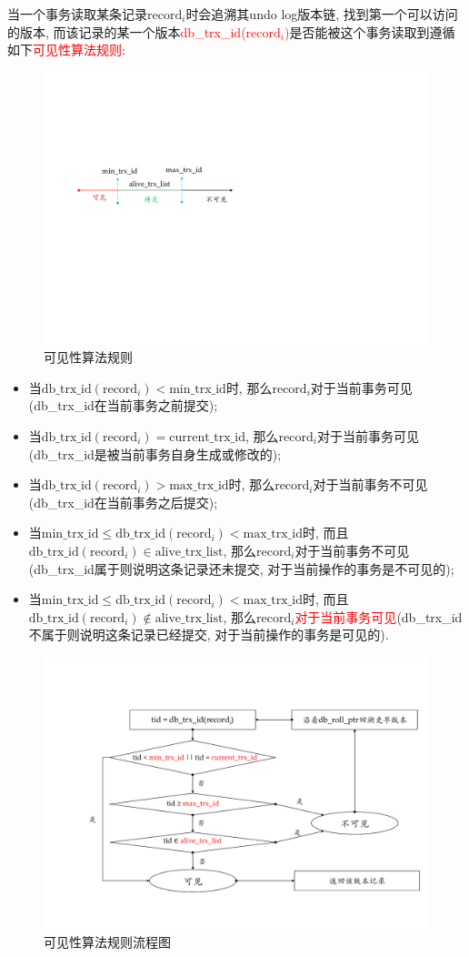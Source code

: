 当一个事务读取某条记录$\text{record}_i$时会追溯其undo log版本链, 找到第一个可以访问的版本, 而该记录的某一个版本\textcolor{red}{db\_trx\_id($\text{record}_i$)}是否能被这个事务读取到遵循如下\textcolor{red}{可见性算法规则}:
\begin{figure}[H]
    \centering
    \includegraphics[width=.5\textwidth]{figure/可见性算法规则.pdf}
    \caption{可见性算法规则}
\end{figure}
\begin{itemize}
  \item 当$\text{db\_trx\_id}(\text{record}_i)<\text{min\_trx\_id}$时, 那么$\text{record}_i$对于当前事务可见(db\_trx\_id在当前事务之前提交);
  \item 当$\text{db\_trx\_id}(\text{record}_i)=\text{current\_trx\_id}$, 那么$\text{record}_i$对于当前事务可见(db\_trx\_id是被当前事务自身生成或修改的);
  \item 当$\text{db\_trx\_id}(\text{record}_i)>\text{max\_trx\_id}$时, 那么$\text{record}_i$对于当前事务不可见(db\_trx\_id在当前事务之后提交);
  \item 当$\text{min\_trx\_id}\leq \text{db\_trx\_id}(\text{record}_i)<\text{max\_trx\_id}$时, 而且$\text{db\_trx\_id}(\text{record}_i) \in \text{alive\_trx\_list}$, 那么$\text{record}_i$对于当前事务不可见(db\_trx\_id属于则说明这条记录还未提交, 对于当前操作的事务是不可见的);
  \item 当$\text{min\_trx\_id}\leq \text{db\_trx\_id}(\text{record}_i)<\text{max\_trx\_id}$时, 而且$\text{db\_trx\_id}(\text{record}_i) \not\in \text{alive\_trx\_list}$, 那么$\text{record}_i$\textcolor{red}{对于当前事务可见}(db\_trx\_id不属于则说明这条记录已经提交, 对于当前操作的事务是可见的).
\end{itemize}

\begin{figure}[H]
    \centering
    \includegraphics[width=.8\textwidth]{figure/可见性流程图.pdf}
    \caption{可见性算法规则流程图}
\end{figure}

